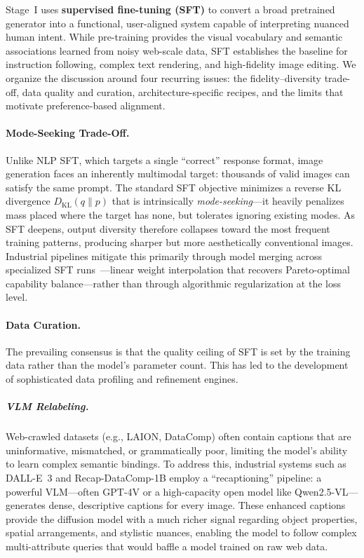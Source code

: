 Stage~I uses \textbf{supervised fine-tuning (SFT)} to convert a broad pretrained generator into a functional, user-aligned system capable of interpreting nuanced human intent. While pre-training provides the visual vocabulary and semantic associations learned from noisy web-scale data, SFT establishes the baseline for instruction following, complex text rendering, and high-fidelity image editing. We organize the discussion around four recurring issues: the fidelity--diversity trade-off, data quality and curation, architecture-specific recipes, and the limits that motivate preference-based alignment.


\paragraph{Mode-Seeking Trade-Off.}
{Unlike NLP SFT, which targets a single ``correct'' response format, image generation faces an inherently multimodal target: thousands of valid images can satisfy the same prompt. The standard SFT objective minimizes a reverse KL divergence $D_{\mathrm{KL}}(q\|p)$ that is intrinsically \emph{mode-seeking}---it heavily penalizes mass placed where the target has none, but tolerates ignoring existing modes. As SFT deepens, output diversity therefore collapses toward the most frequent training patterns, producing sharper but more aesthetically conventional images. Industrial pipelines mitigate this primarily through model merging across specialized SFT runs~\citep{cai2025z,team2025longcat}---linear weight interpolation that recovers Pareto-optimal capability balance---rather than through algorithmic regularization at the loss level.}

\paragraph{Data Curation.}

The prevailing consensus is that the quality ceiling of SFT is set by the training data rather than the model's parameter count. This has led to the development of sophisticated data profiling and refinement engines.

\subparagraph{VLM Relabeling.}
Web-crawled datasets (e.g., LAION, DataComp) often contain captions that are uninformative, mismatched, or grammatically poor, limiting the model's ability to learn complex semantic bindings. To address this, industrial systems such as DALL-E~3 and Recap-DataComp-1B employ a ``recaptioning'' pipeline: a powerful VLM---often GPT-4V or a high-capacity open model like Qwen2.5-VL---generates dense, descriptive captions for every image. These enhanced captions provide the diffusion model with a much richer signal regarding object properties, spatial arrangements, and stylistic nuances, enabling the model to follow complex multi-attribute queries that would baffle a model trained on raw web data.

